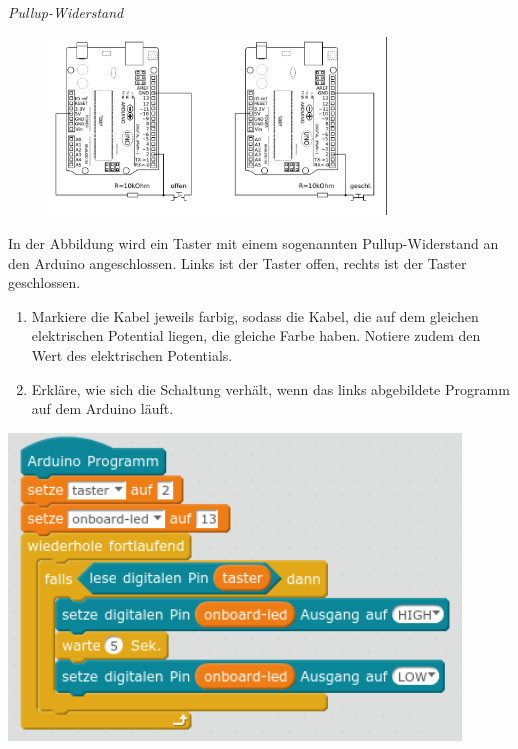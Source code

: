 \documentclass[ngerman, 11pt]{scrreprt}
\begin{document}
	\bigskip
	\begin{aufgabe} \emph{Pullup-Widerstand}
		
		\begin{figure}[H]
			\centering
			\includegraphics[width=0.8\textwidth]{../Zeichnungen/schaltplan-pullup.png}
		\end{figure}
		In der Abbildung wird ein Taster mit einem sogenannten Pullup-Widerstand an den Arduino angeschlossen. Links ist der Taster offen, rechts ist der Taster geschlossen.
		
		\bigskip
		\begin{minipage}{0.48\textwidth}
			\begin{enumerate}[label=\alph*), itemsep=0ex]
				\item Markiere die Kabel jeweils farbig, sodass die Kabel, die auf dem gleichen elektrischen Potential liegen, die gleiche Farbe haben. Notiere zudem den Wert des elektrischen Potentials.
				\item Erkläre, wie sich die Schaltung verhält, wenn das links abgebildete Programm auf dem Arduino läuft.
			\end{enumerate}
		\end{minipage}
		\hfill
		\begin{minipage}{0.5\textwidth}
			\centering
			\includegraphics[width=0.9\textwidth]{../pics/programm-pullup-schaltung.png}
		\end{minipage}
	\end{aufgabe}
\end{document}
